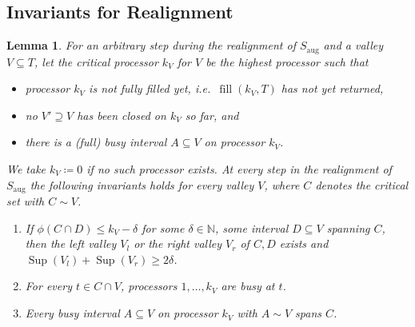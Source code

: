 \documentclass[a4paper]{article}
\DeclareMathOperator{\aug}{aug}
\DeclareMathOperator{\fillop}{fill}
\DeclareMathOperator{\res}{Sup}
\newtheorem{lemma}[theorem]{Lemma}
\begin{document}
\subsection{Invariants for Realignment}
\begin{lemma}\label{lemma:invariant}
  For an arbitrary step during the realignment of $S_{\aug}$ and a valley $V \subseteq T$, let the \emph{critical processor $k_V$ for $V$} be the highest processor such that
  \begin{itemize}
    \item
      processor $k_V$ is not fully filled yet, i.e.\ $\fillop(k_V, T)$ has not yet returned,
    \item
      no $V' \supseteq V$ has been closed on $k_V$ so far, and
    \item
      there is a (full) busy interval $A \subseteq V$ on processor $k_V$.
  \end{itemize}
  We take $k_V \coloneqq 0$ if no such processor exists.
  At every step in the realignment of $S_{\aug}$ the following invariants holds for every valley $V$, where $C$ denotes the critical set with $C \sim V$.
  \begin{enumerate}
    \item
      If $\phi(C \cap D) \leq k_V - \delta$ for some $\delta \in \mathbb{N}$, some interval $D \subseteq V$ spanning $C$, then the left valley $V_l$ or the right valley $V_r$ of $C, D$ exists and $\res(V_l) + \res(V_r) \geq 2 \delta$.
    \item
      For every $t \in C \cap V$, processors $1, \ldots, k_V$ are busy at $t$.
    \item
      Every busy interval $A \subseteq V$ on processor $k_V$ with $A \sim V$ spans $C$.
  \end{enumerate}
\end{lemma}
\end{document}
